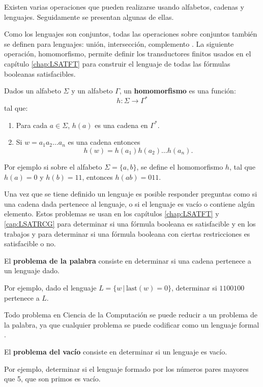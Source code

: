 Existen varias operaciones que pueden realizarse usando alfabetos, cadenas y lenguajes. Seguidamente se presentan algunas de ellas.

Como los lenguajes son conjuntos, todas las operaciones sobre conjuntos también se definen para lenguajes: unión, intersección, complemento \cite{authomataTheory}.
La siguiente operación, homomorfismo, permite definir los transductores finitos usados en el capítulo \ref{chap:LSATFT} para 
construir el lenguaje de todas las fórmulas booleanas satisfacibles.

\begin{definition}
  Dados un alfabeto \( \Sigma \) y un alfabeto \( \Gamma \), un \textbf{homomorfismo} es una función:
  \[
    h: \Sigma \to \Gamma^*
  \]
  tal que:
  \begin{enumerate}
    \item Para cada \( a \in \Sigma \), \( h(a) \) es una cadena en \( \Gamma^* \).
    \item Si $w=a_1a_2\ldots a_n$ es una cadena entonces
          $$h(w)=h(a_1)h(a_2)\ldots h(a_n).$$
  \end{enumerate}
\end{definition}

Por ejemplo si sobre el alfabeto $\Sigma=\{a,b\}$, se define el homomorfismo $h$, tal que $h(a)=0$ y $h(b)=11$, entonces
$h(ab)=011$.


Una vez que se tiene definido un lenguaje es posible responder preguntas como si una cadena dada pertenece al lenguaje, o si el lenguaje es vacío o contiene algún elemento.
Estos problemas se usan en los capítulos \ref{chap:LSATFT} y \ref{cap:LSATRCG} para determinar si una fórmula booleana
es satisfacible y en los trabajos \cite{aCFSAT} y \cite{aSRCSAT} para determinar si una fórmula booleana con ciertas restricciones es 
satisfacible o no.

\begin{definition}
  El \textbf{problema de la palabra} consiste en determinar si una cadena pertenece a un lenguaje dado. 
\end{definition}
Por ejemplo, dado el lenguaje $L=\{w\,|\,\text{last}(w)=0\}$, determinar si $1100100$ pertenece a $L$.

Todo problema en Ciencia de la Computación se puede reducir a un problema de la palabra, ya que cualquier problema se puede codificar como un lenguaje formal \cite{authomataTheory}.

\begin{definition} 
  El \textbf{problema del vacío} consiste en determinar si un lenguaje es vacío.
\end{definition}
Por ejemplo, determinar si el lenguaje formado por los números pares mayores que 5, que son primos es vacío.

